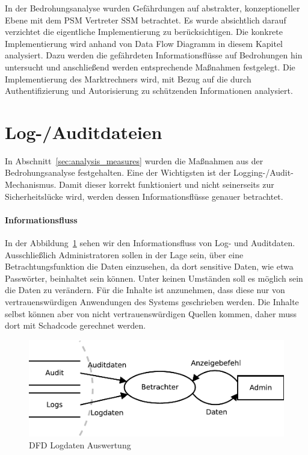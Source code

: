 \documentclass[11pt,a4paper]{report}
\begin{document}
In der Bedrohungsanalyse wurden Gefährdungen auf abstrakter, konzeptioneller Ebene mit dem PSM Vertreter SSM betrachtet. Es wurde absichtlich darauf verzichtet die eigentliche Implementierung zu berücksichtigen. Die konkrete Implementierung wird anhand von Data Flow Diagramm in diesem Kapitel analysiert. Dazu werden die gefährdeten Informationsflüsse auf Bedrohungen hin untersucht und anschließend werden entsprechende Maßnahmen festgelegt. Die Implementierung des Marktrechners wird, mit Bezug auf die durch Authentifizierung und Autorisierung zu schützenden Informationen analysiert.

\section{Log-/Auditdateien}

In Abschnitt~\ref{sec:analysis_measures} wurden die Maßnahmen aus der Bedrohungsanalyse festgehalten. Eine der Wichtigsten ist der Logging-/Audit-Mechanismus. Damit dieser korrekt funktioniert und nicht seinerseits zur Sicherheitslücke wird, werden dessen Informationsflüsse genauer betrachtet.

\paragraph{Informationsfluss}
In der Abbildung~\ref{fig:dfd_logs} sehen wir den Informationsfluss von Log- und Auditdaten. Ausschließlich Administratoren sollen in der Lage sein, über eine  Betrachtungsfunktion die Daten einzusehen, da dort sensitive Daten, wie etwa Passwörter, beinhaltet sein können. Unter keinen Umständen soll es möglich sein die Daten zu verändern. Für die Inhalte ist anzunehmen, dass diese nur von vertrauenswürdigen Anwendungen des Systems geschrieben werden. Die Inhalte selbst können aber von nicht vertrauenswürdigen Quellen kommen, daher muss dort mit Schadcode gerechnet werden.

\begin{figure}[htbp]
\centering
\includegraphics[scale=0.7]{images/dfd_logs.pdf}
\caption{DFD Logdaten Auswertung}
\label{fig:dfd_logs}
\end{figure}
\end{document}

